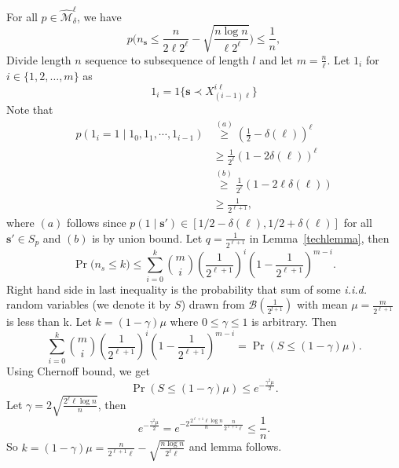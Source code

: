 \documentclass[conference,a4paper]{article}
\newcommand{\s}{\textbf{s}}
\newcommand{\M}{\mathcal{M}}
\newcommand{\iid}{\emph{i.i.d.}\xspace}
\begin{document}
\bLemma
\label{probLem}
For all $p\in \hat{\M}_{\delta}^{\ell}$, we have
\[
p\bigg(n_\s\leq\frac{n}{2\ell 2^\ell}-\sqrt{\frac{n\log n}{\ell 2^{\ell}}}\bigg)\leq \frac1{n},
\] 
\Proof 
Divide length $n$ sequence to subsequence of length $l$ and let $m=\frac{n}{\ell}$. Let
$1_i$ for $i\in\{1,2,\dots,m\}$ as
\[
1_{i}=1\{\s\prec X_{(i-1)\ell}^{i\ell}\}
\]
Note that 
\begin{align*}
p(1_{i}=1\mid 1_{0},1_{1},\cdots,1_{i-1})
&\overset{(a)}{\ge} \left(\frac{1}{2}-\delta(\ell)\right)^{\ell}\\
&\ge \frac{1}{2^{\ell}}(1-2\delta(\ell))^{\ell}\\
&\overset{(b)}{\ge} \frac{1}{2^{\ell}}(1-2\ell\delta(\ell))\\
&\ge \frac{1}{2^{\ell+1}},
\end{align*}
where $(a)$ follows since $p(1\mid \s')\in [1/2-\delta(\ell),1/2+\delta(\ell)]$ for all $\s'\in S_p$ and $(b)$ is by union bound.
Let $q=\frac1{2^{\ell+1}}$ in Lemma~\ref{techlemma}, then
\[
\Pr\big(n_s\leq k\big)\leq  \sum_{i=0}^k{m \choose i}(\frac1{2^{\ell+1}})^i(1-{\frac1{2^{\ell+1}}})^{m-i}.
\]
Right hand side in last inequality is the probability that sum of some  \iid random variables (we denote it by $S$) drawn from $\mathcal{B}(\frac1{2^{l+1}})$ with mean $\mu=\frac{m}{2^{\ell+1}}$ is less than k. Let $k=(1-\gamma)\mu$ where $0 \leq \gamma\leq 1$ is arbitrary. Then
\[
\sum_{i=0}^k{m \choose i}(\frac1{2^{\ell+1}})^i(1-\frac1{2^{\ell+1}})^{m-i}=\Pr(S\leq (1-\gamma)\mu).
\]
Using Chernoff bound, we get
\[
\Pr(S\leq (1-\gamma)\mu)\leq e^{-\frac{\gamma^2\mu}{2}}.
\]
Let $\gamma=2\sqrt{\frac{2^{\ell}\ell\log n}{n}}$, then 
\[
 e^{-\frac{\gamma^2\mu}{2}}
 =e^{-2\frac{2^{\ell+1}\ell\log n}{n}\frac{n}{2^{\ell+1}\ell}}
 \leq \frac1{n}.
\]
So $k=(1-\gamma)\mu=\frac{n}{2^{\ell+1}\ell}-\sqrt{\frac{n\log n}{2^{\ell}\ell}}$ and lemma follows.
\eLemma
\end{document}
